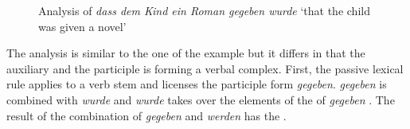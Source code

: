 \begin{figure}
\caption{\label{fig-dem-Kind-ein-Roman-gegeben-wurde}Analysis of \emph{dass dem Kind ein Roman gegeben
    wurde} `that the child was given a novel'}
\end{figure}

\noindent
The analysis is similar to the one of the  example but it differs in that the auxiliary and
the participle is forming a verbal complex. First, the passive lexical rule applies to a verb stem
 and licenses the participle form \emph{gegeben}. \emph{gegeben}  is combined with
\emph{wurde} and \emph{wurde} takes over the elements of the \compsl of \emph{gegeben} . The result of the combination of \emph{gegeben} and \emph{werden} has the
\compsl {}.



